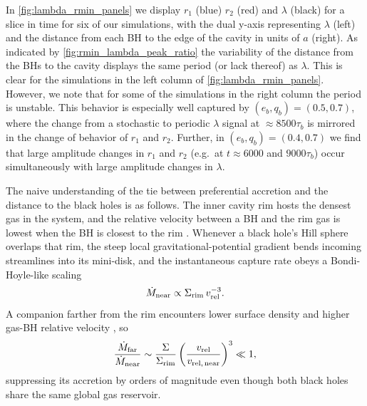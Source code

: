 \documentclass[fleqn,usenatbib]{mnras}
\begin{document}
In \autoref{fig:lambda_rmin_panels} we display $r_1$ (blue) $r_2$ (red) and $\lambda$ (black) for a slice in time for six of our simulations, with the dual y-axis representing $\lambda$ (left) and the distance from each BH to the edge of the cavity in units of $a$ (right). As indicated by \autoref{fig:rmin_lambda_peak_ratio} the variability of the distance from the BHs to the cavity displays the same period (or lack thereof) as $\lambda$. This is clear for the simulations in the left column of \autoref{fig:lambda_rmin_panels}. However, we note that for some of the simulations in the right column the period is unstable. This behavior is especially well captured by $(e_b, q_b) = (0.5, 0.7)$, where the change from a stochastic to periodic $\lambda$ signal at $\approx 8500 \tau_b$ is mirrored in the change of behavior of $r_1$ and $r_2$. Further, in $(e_b, q_b) = (0.4, 0.7)$ we find that large amplitude changes in $r_1$ and $r_2$ (e.g.\ at $t \approx 6000$ and $9000 \tau_b$) occur simultaneously with large amplitude changes in $\lambda$.

The naive understanding of the tie between preferential accretion and the distance to the black holes is as follows. The inner cavity rim hosts the densest gas in the system, and the relative velocity between a BH and the rim gas is lowest when the BH is closest to the rim \citep{shi_2012, farris_2014, duffell_dorazio_2020}. Whenever a black hole's Hill sphere overlaps that rim, the steep local gravitational-potential gradient bends incoming streamlines into its mini-disk, and the instantaneous capture rate obeys a Bondi-Hoyle-like scaling
\begin{equation}
  \dot{M}_{\rm near} \propto \Sigma_{\rm rim} \, v_{\rm rel}^{-3}.
\end{equation}
A companion farther from the rim encounters lower surface density and higher gas-BH relative velocity \citep{miranda_munoz_lai_2017, dorazio_duffel}, so
\begin{equation}
  \frac{\dot{M}_{\rm far}}{\dot{M}_{\rm near}} \sim \frac{\Sigma}{\Sigma_{\rm rim}} \left(\frac{v_{\rm rel}}{v_{\rm rel,\,near}}\right)^{3} \ll 1,
\end{equation}
suppressing its accretion by orders of magnitude even though both black holes share the same global gas reservoir.
\end{document}
